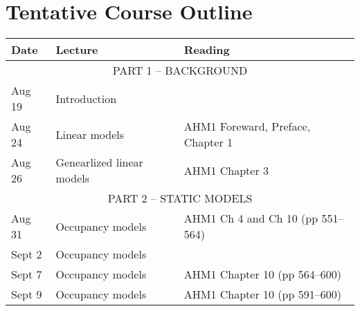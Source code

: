 \documentclass[12pt]{article}
\begin{document}
\clearpage

\section*{\normalsize Tentative Course Outline}
\vspace{-6mm}

\begin{center}
\begin{tabular}[c]{lll}
\hline \hline
{\bf Date} & {\bf Lecture}                                & {\bf Reading}                                        \\
\hline
           \multicolumn{3}{c}{PART 1 -- BACKGROUND}                                                              \\
\hline
Aug 19     & Introduction                                 &                                                      \\
\hline
Aug 24     & Linear models                                & AHM1 Foreward, Preface, Chapter 1                    \\
Aug 26     & Genearlized linear models                    & AHM1 Chapter 3                                    \\
\hline
           \multicolumn{3}{c}{PART 2 -- STATIC MODELS}                                                           \\
\hline
Aug 31     & Occupancy models                             & AHM1 Ch 4 and Ch 10 (pp 551--564)                    \\
Sept 2     & Occupancy models                             &                                                      \\
\hline
Sept 7     & Occupancy models                             & AHM1 Chapter 10 (pp 564--600)                        \\
Sept 9     & Occupancy models                             & AHM1 Chapter 10 (pp 591--600)                        \\
\hline

\end{tabular}
\end{center}
\end{document}
